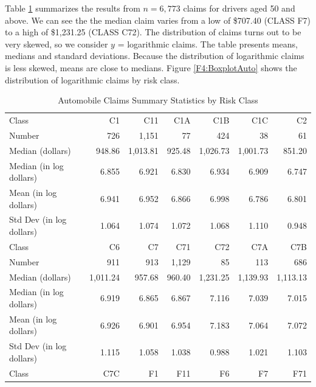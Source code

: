 Table \ref{T4:AutoSumStats} summarizes the results from $n=6,773$
claims for drivers aged 50 and above. We can see the the median
claim varies from a low of \$707.40 (CLASS F7) to a high of
\$1,231.25 (CLASS C72). The distribution of claims turns out to be
very skewed, so we consider $y$ = logarithmic claims. The table
presents means, medians and standard deviations. Because the
distribution of logarithmic claims is less skewed, means are close
to medians. Figure \ref{F4:BoxplotAuto} shows the distribution of
logarithmic claims by risk class.



\begin{table}[h]
\caption{\label{T4:AutoSumStats} Automobile Claims Summary
Statistics by Risk Class}
\begin{tabular}{l|rrrrrr}
\hline
     Class &        C1  &        C11 &        C1A &        C1B &        C1C &        C2  \\
    Number &        726 &       1,151 &         77 &        424 &         38 &         61 \\
Median (dollars) &     948.86 &   1,013.81 &     925.48 &   1,026.73 &   1,001.73 &     851.20 \\
Median (in log dollars) &      6.855 &      6.921 &      6.830 &      6.934 &      6.909 &      6.747 \\
Mean (in log dollars) &      6.941 &      6.952 &      6.866 &      6.998 &      6.786 &      6.801 \\
Std Dev (in log dollars) &      1.064 &      1.074 &      1.072 &      1.068 &      1.110 &      0.948 \\
\hline
     Class &        C6  &        C7  &        C71 &        C72 &        C7A &        C7B \\
    Number &        911 &        913 &       1,129 &         85 &        113 &        686 \\
Median (dollars) &   1,011.24 &     957.68 &     960.40 &   1,231.25 &   1,139.93 &   1,113.13 \\
Median (in log dollars) &      6.919 &      6.865 &      6.867 &      7.116 &      7.039 &      7.015 \\
Mean (in log dollars) &      6.926 &      6.901 &      6.954 &      7.183 &      7.064 &      7.072 \\
Std Dev (in log dollars) &      1.115 &      1.058 &      1.038 &      0.988 &      1.021 &      1.103 \\
\hline
     Class &        C7C &        F1  &        F11 &        F6  &        F7  &        F71 \\

\end{tabular}
\end{table}
